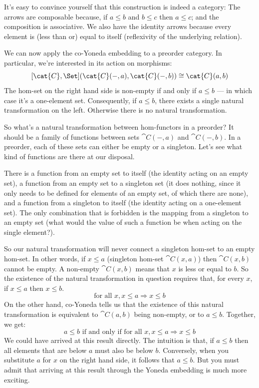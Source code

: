 It's easy to convince yourself that this construction is indeed a
category: The arrows are composable because, if
$a \leqslant b$ and $b \leqslant c$ then
$a \leqslant c$; and the composition is associative. We also
have the identity arrows because every element is (less than or) equal
to itself (reflexivity of the underlying relation).

We can now apply the co-Yoneda embedding to a preorder category. In
particular, we're interested in its action on morphisms:
\[[\cat{C}, \Set](\cat{C}(-, a), \cat{C}(-, b)) \cong \cat{C}(a, b)\]
The hom-set on the right hand side is non-empty if and only if
$a \leqslant b$ --- in which case it's a one-element set.
Consequently, if $a \leqslant b$, there exists a single
natural transformation on the left. Otherwise there is no natural
transformation.

So what's a natural transformation between hom-functors in a preorder?
It should be a family of functions between sets $\cat{C}(-, a)$ and
$\cat{C}(-, b)$. In a preorder, each of these sets can either be empty
or a singleton. Let's see what kind of functions are there at our
disposal.

There is a function from an empty set to itself (the identity acting on
an empty set), a function  from an empty set to a
singleton set (it does nothing, since it only needs to be defined for
elements of an empty set, of which there are none), and a function from
a singleton to itself (the identity acting on a one-element set). The
only combination that is forbidden is the mapping from a singleton to an
empty set (what would the value of such a function be when acting on the
single element?).

So our natural transformation will never connect a singleton hom-set to
an empty hom-set. In other words, if $x \leqslant a$
(singleton hom-set $\cat{C}(x, a)$) then $\cat{C}(x, b)$ cannot be
empty. A non-empty $\cat{C}(x, b)$ means that $x$ is less or
equal to $b$. So the existence of the natural transformation in
question requires that, for every $x$, if
$x \leqslant a$ then $x \leqslant b$.
\[\text{for all } x, x \leqslant a \Rightarrow x \leqslant b\]
On the other hand, co-Yoneda tells us that the existence of this natural
transformation is equivalent to $\cat{C}(a, b)$ being non-empty, or to
$a \leqslant b$. Together, we get:
\[a \leqslant b \text{ if and only if for all } x, x \leqslant a \Rightarrow x \leqslant b\]
We could have arrived at this result directly. The intuition is that, if
$a \leqslant b$ then all elements that are below $a$
must also be below $b$. Conversely, when you substitute
$a$ for $x$ on the right hand side, it follows that
$a \leqslant b$. But you must admit that arriving at this
result through the Yoneda embedding is much more exciting.

